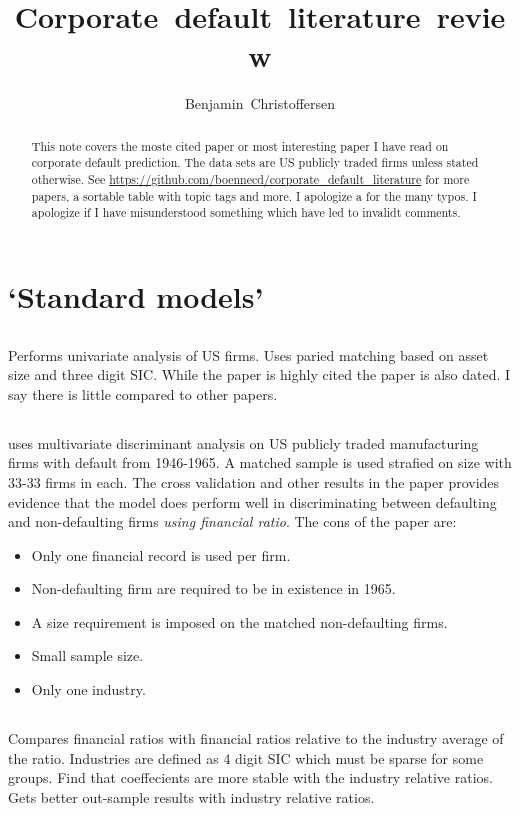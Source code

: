 \documentclass{article}
\title{Corporate~default~literature~review}
\author{Benjamin~Christoffersen}
\newcommand{\seccite}[1]{\subsection{\cite{#1}}\label{sec:#1}}
\begin{document}
\maketitle

\begin{abstract}
This note covers the moste cited paper or most interesting paper I have read on corporate default prediction. The data sets are US publicly traded firms unless stated otherwise. See \url{https://github.com/boennecd/corporate_default_literature} for more papers, a sortable table with topic tags and more. I apologize a for the many typos. I apologize if I have misunderstood something which have led to invalidt comments.
\end{abstract}

\tableofcontents

\section{`Standard models'}

\seccite{beaver66}
Performs univariate analysis of US firms. Uses paried matching based on asset size and three digit SIC. While the paper is highly cited the paper is also dated. I say there is little compared to other papers.

\seccite{altman68}
uses multivariate discriminant analysis on US publicly traded manufacturing firms with default from 1946-1965. A matched sample is used strafied on size with 33-33 firms in each. The cross validation and other results in the paper provides evidence that the model does perform well in discriminating between defaulting and non-defaulting firms \emph{using financial ratio}. The cons of the paper are:

\begin{itemize}
  \item Only one financial record is used per firm.
  \item Non-defaulting firm are required to be in existence in 1965.
  \item A size requirement is imposed on the matched non-defaulting firms. 
  \item Small sample size.
  \item Only one industry.
\end{itemize}



\seccite{platt91}
Compares financial ratios with financial ratios relative to the industry average of the ratio. Industries are defined as 4 digit SIC which must be sparse for some groups. Find that coeffecients are more stable with the industry relative ratios. Gets better out-sample results with industry relative ratios.
\end{document}
